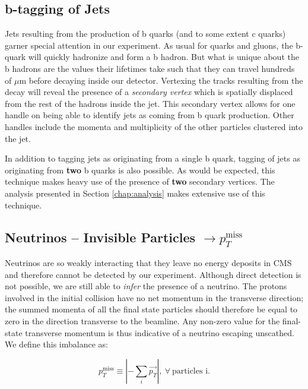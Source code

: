 \subsection{b-tagging of Jets}

Jets resulting from the production of b quarks (and to some extent c quarks) garner special attention in our experiment. As usual for quarks and gluons, the b-quark will quickly hadronize and form a b hadron. But what is unique about the b hadrons are the values their lifetimes take such that they can travel hundreds of $\mu$m before decaying inside our detector. Vertexing the tracks resulting from the decay will reveal the presence of a \textit{secondary vertex} which is spatially displaced from the rest of the hadrons inside the jet. This secondary vertex allows for one handle on being able to identify jets as coming from b quark production. Other handles include the momenta and multiplicity of the other particles clustered into the jet.

In addition to tagging jets as originating from a single b quark, tagging of jets as originating from \textbf{two} b quarks is also possible.\cite{bbtagger} As would be expected, this technique makes heavy use of the presence of \textbf{two} secondary vertices. The analysis presented in Section \ref{chap:analysis} makes extensive use of this technique.

\subsection{Neutrinos -- Invisible Particles $\rightarrow p_{T}^{\mathrm{miss}}$}

Neutrinos are so weakly interacting that they leave no energy deposits in CMS and therefore cannot be detected by our experiment. Although direct detection is not possible, we are still able to \textit{infer} the presence of a neutrino. The protons involved in the initial collision have no net momentum in the transverse direction; the summed momenta of all the final state particles should therefore be equal to zero in the direction transverse to the beamline. Any non-zero value for the final-state transverse momentum is thus indicative of a neutrino escaping unscathed. We define this imbalance as:

\begin{equation}
p_{T}^{\mathrm{miss}}  \equiv \left | - \sum_{i} \vec{p_{T}} \right |,~\forall~\textrm{particles~i}.
\end{equation}

